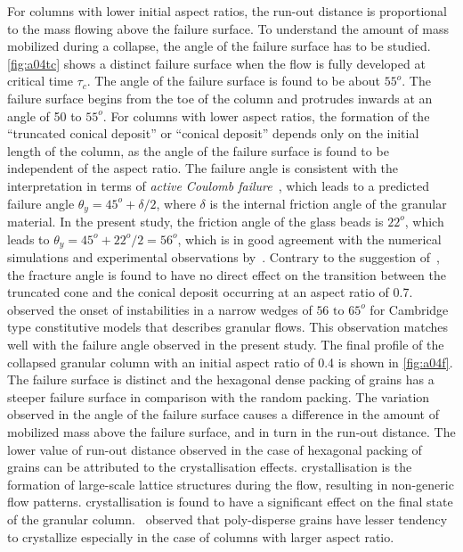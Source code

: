 For columns with lower initial aspect ratios, the run-out distance is 
proportional to the mass flowing above the failure surface. To understand the 
amount of mass mobilized during a collapse, the angle of the failure surface 
has to be studied. \cref{fig:a04tc} shows a distinct failure surface 
when the flow is fully developed at critical time $\tau_{\textit{c}}$. The 
angle of the failure surface is found to be about $55^{o}$. The failure surface 
begins from the toe of the column and protrudes inwards at an angle of 50 to 
$55^{o}$. For columns with lower aspect ratios, the formation of the 
``truncated conical deposit'' or ``conical deposit'' depends only on the 
initial length of the column, as the angle of the failure surface is found to 
be independent of the aspect ratio. The failure angle is consistent with the 
interpretation in terms of \textit{active Coulomb 
failure}~\citep{Lajeunesse2004}, which leads to a predicted failure angle 
$\theta_{\textit{y}}=45^{o}+\delta / 2$, where $\delta$ is the internal 
friction angle of the granular material. In the present study, the friction 
angle of the glass beads is $22^{o}$, which leads to 
$\theta_{\textit{y}}=45^{o}+22^{o}/ 2=56^{o}$, which is in good agreement with 
the numerical simulations and experimental observations 
by~\citet{Lajeunesse2004}. Contrary to the suggestion 
of~\citet{Lajeunesse2004}, the fracture angle is found to have no direct effect 
on the transition between the truncated cone and the conical deposit occurring 
at an aspect ratio of 0.7.~\citet{Schaeffer1990} observed the onset of 
instabilities in a narrow wedges of $56\mbox{ to }65^{o}$ for Cambridge type 
constitutive models that describes granular flows. This observation matches 
well with the failure angle observed in the present study. The final profile of 
the collapsed granular column with an initial aspect ratio of 0.4 is shown in 
\cref{fig:a04f}. The failure surface is distinct and the hexagonal dense 
packing of grains has a steeper failure surface in comparison with the random 
packing. The variation observed in the angle of the failure surface causes a 
difference in the amount of mobilized mass above the failure surface, and in 
turn in the run-out distance. The lower value of run-out distance observed in 
the case of hexagonal packing of grains can be attributed to the 
crystallisation effects. crystallisation is the formation of large-scale 
lattice structures during the flow, resulting in non-generic flow patterns. 
crystallisation is found to have a significant effect on the final state of the 
granular column.~\citet{Lacaze2009} observed that poly-disperse grains have 
lesser tendency to crystallize especially in the case of columns with larger 
aspect ratio. 

